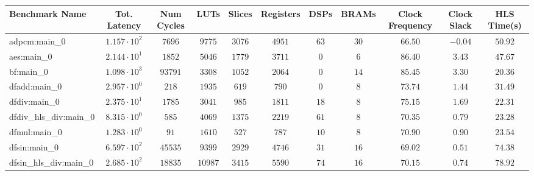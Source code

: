 \begin{tabular}{|l|c|c|c|c|c|c|c|c|c|c|}
\hline
Benchmark Name          & Tot. Latency           & Num Cycles & LUTs      & Slices    & Registers & DSPs    & BRAMs   & Clock Frequency & Clock Slack & HLS Time(s) \\
\hline
adpcm:main\_0           & $ 1.157 \cdot 10^{2} $ & $ 7696   $ & $ 9775  $ & $ 3076  $ & $ 4951  $ & $ 63  $ & $ 30  $ & $ 66.50       $ & $ -0.04   $ & $ 50.92   $ \\
aes:main\_0             & $ 2.144 \cdot 10^{1} $ & $ 1852   $ & $ 5046  $ & $ 1779  $ & $ 3711  $ & $ 0   $ & $ 6   $ & $ 86.40       $ & $ 3.43    $ & $ 47.67   $ \\
bf:main\_0              & $ 1.098 \cdot 10^{3} $ & $ 93791  $ & $ 3308  $ & $ 1052  $ & $ 2064  $ & $ 0   $ & $ 14  $ & $ 85.45       $ & $ 3.30    $ & $ 20.36   $ \\
dfadd:main\_0           & $ 2.957 \cdot 10^{0} $ & $ 218    $ & $ 1935  $ & $ 619   $ & $ 790   $ & $ 0   $ & $ 8   $ & $ 73.74       $ & $ 1.44    $ & $ 31.49   $ \\
dfdiv:main\_0           & $ 2.375 \cdot 10^{1} $ & $ 1785   $ & $ 3041  $ & $ 985   $ & $ 1811  $ & $ 18  $ & $ 8   $ & $ 75.15       $ & $ 1.69    $ & $ 22.31   $ \\
dfdiv\_hls\_div:main\_0 & $ 8.315 \cdot 10^{0} $ & $ 585    $ & $ 4069  $ & $ 1375  $ & $ 2219  $ & $ 61  $ & $ 8   $ & $ 70.35       $ & $ 0.79    $ & $ 23.28   $ \\
dfmul:main\_0           & $ 1.283 \cdot 10^{0} $ & $ 91     $ & $ 1610  $ & $ 527   $ & $ 787   $ & $ 10  $ & $ 8   $ & $ 70.90       $ & $ 0.90    $ & $ 23.54   $ \\
dfsin:main\_0           & $ 6.597 \cdot 10^{2} $ & $ 45535  $ & $ 9399  $ & $ 2929  $ & $ 4746  $ & $ 31  $ & $ 16  $ & $ 69.02       $ & $ 0.51    $ & $ 74.38   $ \\
dfsin\_hls\_div:main\_0 & $ 2.685 \cdot 10^{2} $ & $ 18835  $ & $ 10987 $ & $ 3415  $ & $ 5590  $ & $ 74  $ & $ 16  $ & $ 70.15       $ & $ 0.74    $ & $ 78.92   $ \\

\end{tabular}
